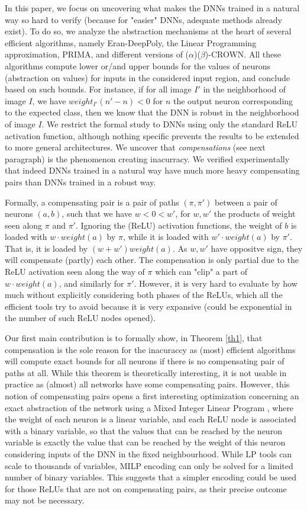 In this paper, we focus on uncovering what makes the DNNs trained in a natural way so hard to verify (because for "easier" DNNs, adequate methods already exist). To do so, we analyze the abstraction mechanisms at the heart of several efficient algorithms, namely Eran-DeepPoly, the Linear Programming approximation, PRIMA, and different versions of ($\alpha$)($\beta$)-CROWN. All these algorithms compute lower or/and upper bounds for the values of neurons (abstraction on values) for inputs in the considered input region, and conclude based on such bounds. For instance, if for all image $I'$ in the neighborhood of image $I$, we have $weight_{I'}(n'-n) < 0$ for $n$ the output neuron corresponding to the expected class, then we know that the DNN is robust in the neighborhood of image $I$. We restrict the formal study to DNNs using only the standard ReLU activation function, although nothing specific prevents the results to be extended to more general architectures. We uncover that {\em compensations} (see next paragraph) is the phenomenon creating  inacurracy. We verified experimentally that indeed DNNs trained in a natural way have much more heavy compensating pairs than DNNs trained in a robust way.


Formally, a compensating pair is a pair of paths $(\pi,\pi')$ between a pair of neurons 
$(a,b)$, such that we have $w < 0 < w'$, for $w,w'$ the products of weight seen along $\pi$ and $\pi'$. Ignoring the (ReLU) activation functions, the weight of $b$ is loaded with $w \cdot weight(a)$ by $\pi$, while it is loaded with $w' \cdot weight(a)$ by $\pi'$. That is, it is loaded by $(w+w') weight(a)$. As $w,w'$ have oppositve sign, they will compensate (partly) each other. The compensation is only partial due to the ReLU activation seen along the way of $\pi$ which can "clip" a part of $w \cdot weight(a)$, and similarly for $\pi'$. However, it is very hard to evaluate by how much without explicitly considering both phases of the ReLUs, which all the efficient tools try to avoid because it is very expansive (could be exponential in the number of such ReLU nodes opened).


Our first main contribution is to formally show, in Theorem \ref{th1}, that compensation is the sole reason for the inacuraccy as (most) efficient algorithms will compute exact bounds for all neurons if there is no compensating pair of paths at all.
While this theorem is theoretically interesting, it is not usable in practice as (almost) all networks have some compensating pairs. However, this notion of compensating pairs opens a first interesting optimization concerning an exact abstraction of the network using a Mixed Integer Linear Program \cite{MILP}, where the weight of each neuron is a linear variable, and each ReLU node is associated with a binary variable, so that the values that can be reached by the neuron variable is exactly the value that can be reached by the weight of this neuron considering inputs of the DNN in the fixed neighbourhood. While LP tools can scale to thousands of variables, MILP encoding can only be solved for a limited number of binary variables. This suggests that a simpler encoding could be used for those ReLUs that are not on compensating pairs, as their precise outcome may not be necessary.

